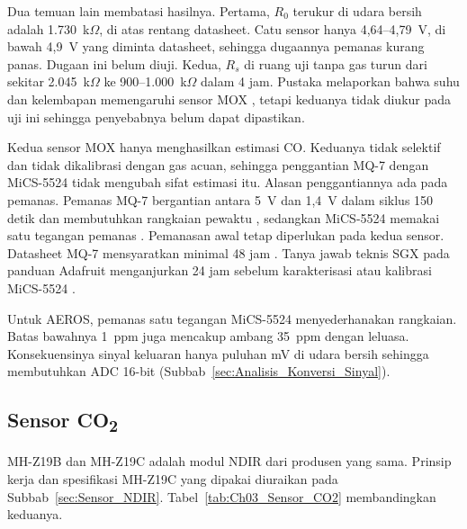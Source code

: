     Dua temuan lain membatasi hasilnya. Pertama, $R_0$ terukur di udara bersih adalah 1.730~k$\Omega$, di atas rentang datasheet. Catu sensor hanya 4,64--4,79~V, di bawah 4,9~V yang diminta datasheet, sehingga dugaannya pemanas kurang panas. Dugaan ini belum diuji. Kedua, $R_s$ di ruang uji tanpa gas turun dari sekitar 2.045~k$\Omega$ ke 900--1.000~k$\Omega$ dalam 4 jam. Pustaka melaporkan bahwa suhu dan kelembapan memengaruhi sensor MOX \cite{mox_drift}, tetapi keduanya tidak diukur pada uji ini sehingga penyebabnya belum dapat dipastikan.

    Kedua sensor MOX hanya menghasilkan estimasi CO. Keduanya tidak selektif dan tidak dikalibrasi dengan gas acuan, sehingga penggantian MQ-7 dengan MiCS-5524 tidak mengubah sifat estimasi itu. Alasan penggantiannya ada pada pemanas. Pemanas MQ-7 bergantian antara 5~V dan 1,4~V dalam siklus 150 detik dan membutuhkan rangkaian pewaktu \cite{mq7}, sedangkan MiCS-5524 memakai satu tegangan pemanas \cite{mics5524}. Pemanasan awal tetap diperlukan pada kedua sensor. Datasheet MQ-7 mensyaratkan minimal 48 jam \cite{mq7}. Tanya jawab teknis SGX pada panduan Adafruit menganjurkan 24 jam sebelum karakterisasi atau kalibrasi MiCS-5524 \cite{adafruit_mics}.

    Untuk AEROS, pemanas satu tegangan MiCS-5524 menyederhanakan rangkaian. Batas bawahnya 1~ppm juga mencakup ambang 35~ppm dengan leluasa. Konsekuensinya sinyal keluaran hanya puluhan mV di udara bersih sehingga membutuhkan ADC 16-bit (Subbab~\ref{sec:Analisis_Konversi_Sinyal}).

    \subsection{Sensor CO\texorpdfstring{\textsubscript{2}}{2}}
    \label{sec:Analisis_Sensor_CO2}

    MH-Z19B dan MH-Z19C adalah modul NDIR dari produsen yang sama. Prinsip kerja dan spesifikasi MH-Z19C yang dipakai diuraikan pada Subbab~\ref{sec:Sensor_NDIR}. Tabel~\ref{tab:Ch03_Sensor_CO2} membandingkan keduanya.

